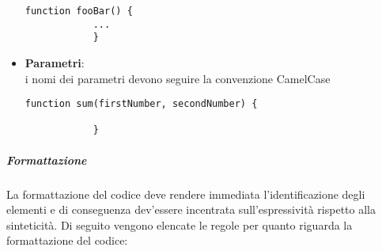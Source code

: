 \begin{itemize}
		\begin{lstlisting}[style=htmlcssjs]
			function fooBar() {
			...
			}
		\end{lstlisting}
	\item \textbf{Parametri}:\\
		i nomi dei parametri devono seguire la convenzione CamelCase \\

		\begin{lstlisting}[style=htmlcssjs]
			function sum(firstNumber, secondNumber) {

			}
		\end{lstlisting}

	\end{itemize}

\subparagraph{Formattazione}

La formattazione del codice deve rendere immediata l'identificazione degli elementi e di conseguenza dev'essere incentrata sull'espressività
rispetto alla sinteticità.
Di seguito vengono elencate le regole per quanto riguarda la formattazione del codice:

